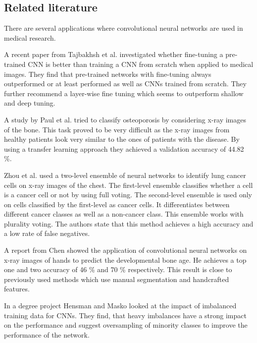\documentclass[12pt]{article}
\begin{document}
\subsection{Related literature}


There are several applications where convolutional neural networks are used in medical research.

A recent paper from Tajbakhsh et al. \cite{tajbakhsh_2017} investigated whether fine-tuning a pre-trained CNN is better than training a CNN from scratch when applied to medical images. They find that pre-trained networks with fine-tuning always outperformed or at least performed as well as CNNs trained from scratch. They further recommend a layer-wise fine tuning which seems to outperform shallow and deep tuning.

A study by Paul et al. \cite{paul_2017} tried to classify osteoporosis by considering x-ray images of the bone. This task proved to be very difficult as the x-ray images from healthy patients look very similar to the ones of patients with the disease. By using a transfer learning approach they achieved a validation accuracy of 44.82 \%.

Zhou et al. \cite{zhou_2002} used a two-level ensemble of neural networks to identify lung cancer cells on x-ray images of the chest. The first-level ensemble classifies whether a cell is a cancer cell or not by using full voting. The second-level ensemble is used only on cells classified by the first-level as cancer cells. It differentiates between different cancer classes as well as a non-cancer class. This ensemble works with plurality voting. The authors state that this method achieves a high accuracy and a low rate of false negatives.

A report from Chen \cite{chen_2016} showed the application of convolutional neural networks on x-ray images of hands to predict the developmental bone age. He achieves a top one and two accuracy of 46 \% and 70 \% respectively. This result is close to previously used methods which use manual segmentation and handcrafted features.

In a degree project Hensman and Masko \cite{hensman_2015} looked at the impact of imbalanced training data for CNNs. They find, that heavy imbalances have a strong impact on the performance and suggest oversampling of minority classes to improve the performance of the network.
\end{document}
